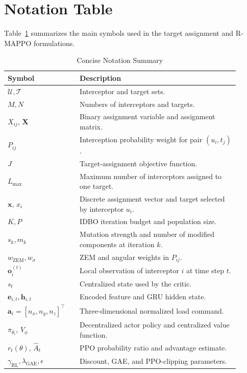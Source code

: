 \documentclass[lettersize,journal]{IEEEtran}
\begin{document}
\appendices
{\color{blue}
\section{Notation Table}
\label{app:notation}

Table~\ref{tab:notation} summarizes the main symbols used in the target assignment and
R-MAPPO formulations.

\begin{table}[!t]
\centering
\caption{Concise Notation Summary}
\label{tab:notation}
\renewcommand{\arraystretch}{1.15}
\footnotesize
\begin{tabular}{p{0.28\linewidth}p{0.62\linewidth}}
\toprule
Symbol & Description \\
\midrule
$\mathcal{U},\mathcal{T}$ & Interceptor and target sets. \\
$M,N$ & Numbers of interceptors and targets. \\
$X_{ij}$, $\mathbf{X}$ & Binary assignment variable and assignment matrix. \\
$P_{ij}$ & Interception probability weight for pair $(u_i,t_j)$. \\
$J$ & Target-assignment objective function. \\
$L_{\max}$ & Maximum number of interceptors assigned to one target. \\
$\mathbf{x}$, $x_i$ & Discrete assignment vector and target selected by interceptor \(u_i\). \\
$K,P$ & IDBO iteration budget and population size. \\
$s_k,m_k$ & Mutation strength and number of modified components at iteration \(k\). \\
$w_{\mathrm{ZEM}},w_\sigma$ & ZEM and angular weights in \(P_{ij}\). \\
$\mathbf{o}_i^{(t)}$ & Local observation of interceptor $i$ at time step $t$. \\
$s_t$ & Centralized state used by the critic. \\
$\mathbf{e}_{i,t},\mathbf{h}_{i,t}$ & Encoded feature and GRU hidden state. \\
$\mathbf{a}_i=[n_x,n_y,n_z]^\top$ & Three-dimensional normalized load command. \\
$\pi_{\theta_i}$, $V_{\phi}$ & Decentralized actor policy and centralized value function. \\
$r_t(\theta)$, $\hat{A}_t$ & PPO probability ratio and advantage estimate. \\
$\gamma_{\mathrm{RL}},\lambda_{\mathrm{GAE}},\epsilon$ & Discount, GAE, and PPO-clipping parameters. \\

\end{tabular}
\end{table}}
\end{document}
